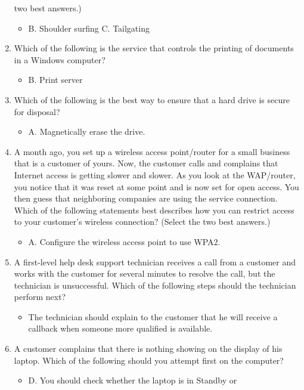 \documentclass{article}
\begin{document}
\begin{enumerate}
two best answers.)
    \begin{itemize}
        \item B. Shoulder surfing C. Tailgating
    \end{itemize}
    \item Which of the following is the service that controls the printing of
documents in a Windows computer?
    \begin{itemize}
        \item B. Print server
    \end{itemize}
    \item Which of the following is the best way to ensure that a hard drive
is secure for disposal?
    \begin{itemize}
        \item A. Magnetically erase the drive.
    \end{itemize}
    \item A month ago, you set up a wireless access point/router for a small
business that is a customer of yours. Now, the customer calls and
complains that Internet access is getting slower and slower. As you
look at the WAP/router, you notice that it was reset at some point
and is now set for open access. You then guess that neighboring
companies are using the service connection. Which of the following
statements best describes how you can restrict access to your
customer’s wireless connection? (Select the two best answers.)
    \begin{itemize}
        \item A. Configure the wireless access point to use WPA2.
    \end{itemize}
    \item A first-level help desk support technician receives a call from a
customer and works with the customer for several minutes to
resolve the call, but the technician is unsuccessful. Which of the
following steps should the technician perform next?
    \begin{itemize}
        \item The technician should explain to the customer that he
will receive a callback when someone more qualified is
available.
    \end{itemize}
    \item A customer complains that there is nothing showing on the display
of his laptop. Which of the following should you attempt first on
the computer?
    \begin{itemize}
        \item D. You should check whether the laptop is in Standby or

\end{itemize}
\end{enumerate}
\end{document}
